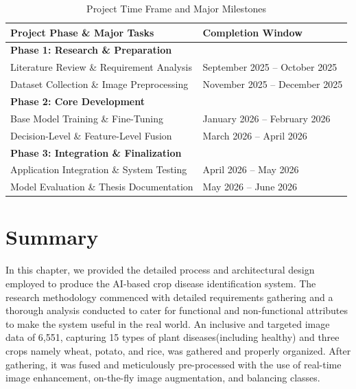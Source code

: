 \begin{table}[H]
\centering
\label{tab:time_frame}
\renewcommand{\arraystretch}{1.4}
\begin{tabular}{@{} l l @{}}
\toprule
\textbf{Project Phase \& Major Tasks} & \textbf{Completion Window} \\
\midrule
\textbf{Phase 1: Research \& Preparation} & \\
\hspace{0.5cm} Literature Review \& Requirement Analysis & September 2025 -- October 2025 \\
\hspace{0.5cm} Dataset Collection \& Image Preprocessing & November 2025 -- December 2025 \\
\midrule
\textbf{Phase 2: Core Development} & \\
\hspace{0.5cm} Base Model Training \& Fine-Tuning & January 2026 -- February 2026 \\
\hspace{0.5cm} Decision-Level \& Feature-Level Fusion & March 2026 -- April 2026 \\
\midrule
\textbf{Phase 3: Integration \& Finalization} & \\
\hspace{0.5cm} Application Integration \& System Testing & April 2026 -- May 2026 \\
\hspace{0.5cm} Model Evaluation \& Thesis Documentation & May 2026 -- June 2026 \\
\bottomrule
\end{tabular}
\caption{Project Time Frame and Major Milestones}
\end{table}


\section{Summary}

In this chapter, we provided the detailed process and architectural design employed to produce the AI-based crop disease identification system. The research methodology commenced with detailed requirements gathering and a thorough analysis conducted to cater for functional and non-functional attributes to make the system useful in the real world. An inclusive and targeted image data of 6,551, capturing 15 types of plant diseases(including healthy) and three crops namely wheat, potato, and rice, was gathered and properly organized. After gathering, it was fused and meticulously pre-processed with the use of real-time image enhancement, on-the-fly image augmentation, and balancing classes.


